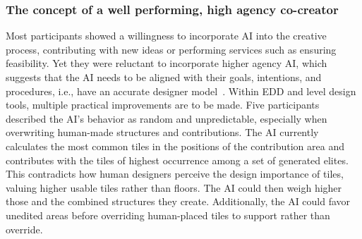 




\subsubsection{The concept of a well performing, high agency co-creator}




Most participants showed a willingness to incorporate AI into the creative process, contributing with new ideas or performing services such as ensuring feasibility. Yet they were reluctant to incorporate higher agency AI, which suggests that the AI needs to be aligned with their goals, intentions, and procedures, i.e., have an accurate designer model~\cite{p13liapis_designer_2013}. Within EDD and level design tools, multiple practical improvements are to be made. Five participants described the AI's behavior as random and unpredictable, especially when overwriting human-made structures and contributions. The AI currently calculates the most common tiles in the positions of the contribution area and contributes with the tiles of highest occurrence among a set of generated elites. This contradicts how human designers perceive the design importance of tiles, valuing higher usable tiles rather than floors. The AI could then weigh higher those and the combined structures they create. Additionally, the AI could favor unedited areas before overriding human-placed tiles to support rather than override. 

